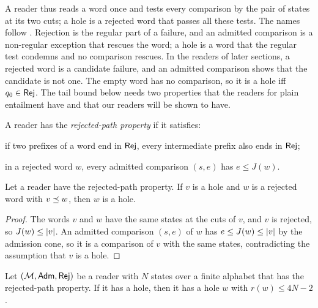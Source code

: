 A reader thus reads a word once and tests every comparison by the pair of
states at its two cuts; a hole is a rejected word that passes all these tests.
The names follow \citet{Zhao26}. Rejection is the regular part of a
failure, and an admitted comparison is a non-regular exception that rescues
the word; a hole is a word that the regular test condemns and no comparison
rescues. In the readers of later sections, a rejected word is a candidate
failure, and an admitted comparison shows that the candidate is not one. The
empty word has no comparison, so it is a hole iff $q_0\in\mathsf{Rej}$. The tail
bound below needs two properties that the readers for plain entailment have
and that our readers will be shown to have.

\begin{definition}\label{def:bg-rpp}
A reader has the \emph{rejected-path property} if it satisfies:
\begin{description}[style=nextline,leftmargin=1em,font=\normalfont\itshape]
\item[Betweenness] if two prefixes of a word end in $\mathsf{Rej}$, every intermediate
  prefix also ends in $\mathsf{Rej}$;
\item[Admission cone] in a rejected word $w$, every admitted comparison $(s,e)$
  has $e\le J(w)$.
\end{description}
\end{definition}

\begin{lemma}\label{lem:bg-extension}
Let a reader have the rejected-path property. If $v$ is a hole and $w$ is a
rejected word with $v\preceq w$, then $w$ is a hole.
\end{lemma}
\begin{proof}
The words $v$ and $w$ have the same states at the cuts of $v$, and $v$ is
rejected, so $J(w)\le\lvert v\rvert$. An admitted comparison $(s,e)$ of $w$ has
$e\le J(w)\le\lvert v\rvert$ by the admission cone, so it is a comparison of $v$ with
the same states, contradicting the assumption that $v$ is a hole.
\end{proof}

\begin{theorem}\label{thm:bg-brt}
Let $(\mathcal M,\mathsf{Adm},\mathsf{Rej})$ be a reader with $N$ states over a finite alphabet
that has the rejected-path property. If it has a hole, then it has a hole $w$
with $r(w)\le4N-2$.
\end{theorem}

